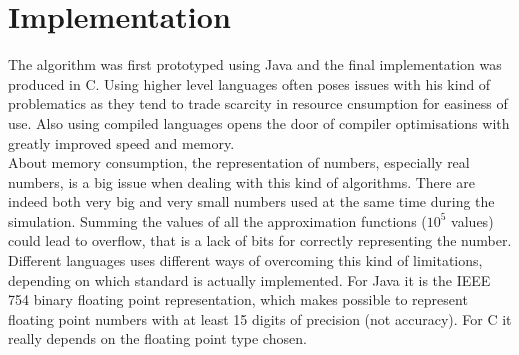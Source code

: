 \section{Implementation}\label{sec:implementation}
	The algorithm was first prototyped using Java and the final implementation was produced in C. Using higher level languages often poses issues with his kind of problematics as they tend to trade scarcity in resource cnsumption for easiness of use. Also using compiled languages opens the door of compiler optimisations with greatly improved speed and memory.\\\indent
	About memory consumption, the representation of numbers, especially real numbers, is a big issue when dealing with this kind of algorithms. There are indeed both very big and very small numbers used at the same time during the simulation. Summing the values of all the approximation functions ($10^5$ values) could lead to overflow, that is a lack of bits for correctly representing the number. Different languages uses different ways of overcoming this kind of limitations, depending on which standard is actually implemented. For Java it is the IEEE 754 binary floating point representation, which makes possible to represent floating point numbers with at least 15 digits of precision (not accuracy). For C it really depends on the floating point type chosen.
